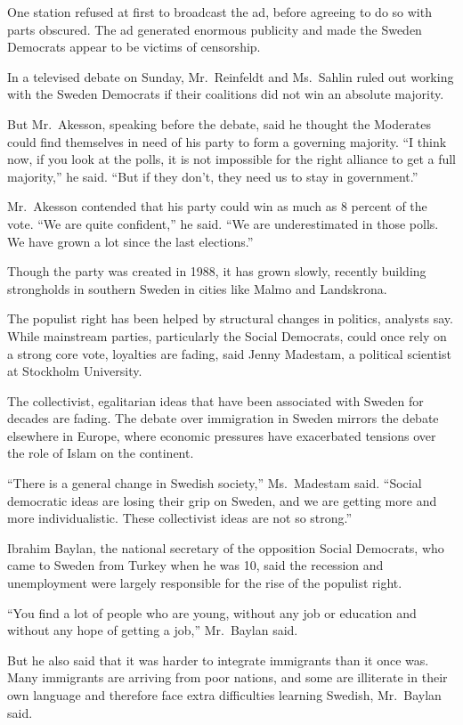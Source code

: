 ﻿\documentclass[12pt]{article}
\begin{document}
One station refused at first to broadcast the ad, before agreeing to do so with parts obscured. The
ad generated enormous publicity and made the Sweden Democrats appear to be victims of censorship.

In a televised debate on Sunday, Mr.~Reinfeldt and Ms.~Sahlin ruled out working with the Sweden
Democrats if their coalitions did not win an absolute majority.

But Mr.~Akesson, speaking before the debate, said he thought the Moderates could find themselves in
need of his party to form a governing majority. ``I think now, if you look at the polls, it is not
impossible for the right alliance to get a full majority,'' he said. ``But if they don't, they need
us to stay in government.''

Mr.~Akesson contended that his party could win as much as 8 percent of the vote. ``We are quite
confident,'' he said. ``We are underestimated in those polls. We have grown a lot since the last
elections.''

Though the party was created in 1988, it has grown slowly, recently building strongholds in southern
Sweden in cities like Malmo and Landskrona.

The populist right has been helped by structural changes in politics, analysts say. While mainstream
parties, particularly the Social Democrats, could once rely on a strong core vote, loyalties are
fading, said Jenny Madestam, a political scientist at Stockholm University.

The collectivist, egalitarian ideas that have been associated with Sweden for decades are fading.
The debate over immigration in Sweden mirrors the debate elsewhere in Europe, where economic
pressures have exacerbated tensions over the role of Islam on the continent.

``There is a general change in Swedish society,'' Ms.~Madestam said. ``Social democratic ideas are
losing their grip on Sweden, and we are getting more and more individualistic. These collectivist
ideas are not so strong.''

Ibrahim Baylan, the national secretary of the opposition Social Democrats, who came to Sweden from
Turkey when he was 10, said the recession and unemployment were largely responsible for the rise of
the populist right.

``You find a lot of people who are young, without any job or education and without any hope of
getting a job,'' Mr.~Baylan said.

But he also said that it was harder to integrate immigrants than it once was. Many immigrants are
arriving from poor nations, and some are illiterate in their own language and therefore face extra
difficulties learning Swedish, Mr.~Baylan said.
\end{document}
